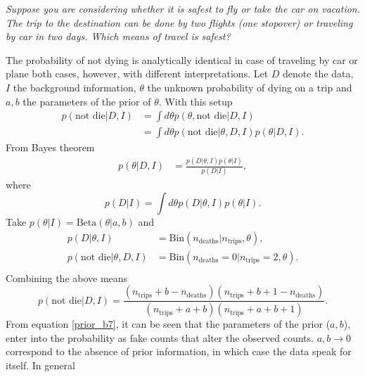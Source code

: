 \begin{example}
	\label{example:travel}
	\emph{Suppose you are considering whether it is safest to fly or take the car on vacation. The trip to the destination can be done by two flights (one stopover) or traveling by car in two days. Which means of travel is safest?}\newline
	
	The probability of not dying is analytically identical in case of traveling by car or plane both cases, however, with different interpretations. Let $D$ denote the data, $I$ the background information, $\theta$ the unknown probability of dying on a trip and $a,b$ the parameters of the prior of $\theta$. With this setup
	\begin{equation}
		\begin{split}
			p(\text{not die}|D,I) &= \int d\theta p(\theta,\text{not die}|D,I)\\
			&=\int d \theta p(\text{not die}|\theta,D,I)p(\theta|D,I).
		\end{split}
		\label{eq_ref}
	\end{equation}
	From Bayes theorem
	\begin{equation}
		\begin{split}
			p(\theta|D,I) & = \frac{p(D|\theta,I)p(\theta|I)}{p(D|I)},
		\end{split}
	\end{equation}
	where
	\begin{equation}
		p(D|I) = \int d\theta p(D|\theta,I)p(\theta|I).
	\end{equation}
	Take $p(\theta|I)=\text{Beta}(\theta|a,b)$ and 
	\begin{equation}
		\begin{split}
			p(D|\theta,I) &= \text{Bin}(n_{\text{deaths}}|n_{\text{trips}},\theta),\\
			p(\text{not die}|\theta,D,I) 
			&= \text{Bin}(n_{\text{deaths}} = 0|n_{\text{trips}} = 2,\theta).\\
		\end{split}
	\end{equation}
	Combining the above means
	\begin{equation}
		p(\text{not die}|D,I) = \frac{(n_{\text{trips}}+b-n_{\text{deaths}})(n_{\text{trips}}+b+1-n_{\text{deaths}})}{(n_{\text{trips}}+a+b)(n_{\text{trips}}+a+b+1)}.
		\label{prior_b7}
	\end{equation}
	From equation \eqref{prior_b7}, it can be seen that the parameters of the prior ($a,b$), enter into the probability as fake counts that alter the observed counts. $a,b\rightarrow 0$ correspond to the absence of prior information, in which case the data speak for itself. In general

\end{example}
